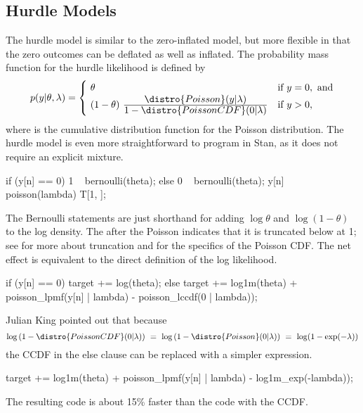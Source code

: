 \subsection{Hurdle Models}

The hurdle model is similar to the zero-inflated model, but more
flexible in that the zero outcomes can be deflated as well as
inflated.  The probability mass function for the hurdle likelihood is
defined by
%
\[
p(y|\theta,\lambda)
= 
\begin{cases}
\ \theta & \mbox{if } y = 0, \mbox{ and}
\\
\ (1 - \theta)
  \
   \frac{\displaystyle \distro{Poisson}(y | \lambda)}
        {\displaystyle \vspace*{8pt} 1 - \distro{PoissonCDF}(0 | \lambda)}
& \mbox{if } y > 0,
\end{cases}
\]
%
where  is the cumulative distribution function for
the Poisson distribution.  The hurdle model is even more straightforward to
program in Stan, as it does not require an explicit mixture.  
%
\begin{stancode}
   if (y[n] == 0)
      1 ~ bernoulli(theta);
    else {
      0 ~ bernoulli(theta);
      y[n] ~ poisson(lambda) T[1, ];
    }
\end{stancode}
%
The Bernoulli statements are just shorthand for adding $\log \theta$
and $\log (1 - \theta)$ to the log density.  The \code{T[1,]} after
the Poisson indicates that it is truncated below at 1; see
 for more about truncation and
 for the specifics of the Poisson CDF.  The net
effect is equivalent to the direct definition of the log likelihood.
%
\begin{stancode}
   if (y[n] == 0)
      target += log(theta);
    else
      target += log1m(theta) + poisson_lpmf(y[n] | lambda)
                - poisson_lccdf(0 | lambda));
\end{stancode}

Julian King pointed out that because
\[
\log \left( 1 - \distro{PoissonCDF}(0 | \lambda) \right)
\ = \ \log \left( 1 - \distro{Poisson}(0 | \lambda) \right) 
\ = \ \log(1 - \exp(-\lambda))
\]
the CCDF in the else clause can be replaced with a simpler expression.
%
\begin{stancode}
      target += log1m(theta) + poisson_lpmf(y[n] | lambda)
                - log1m_exp(-lambda));
\end{stancode}
%
The resulting code is about 15\% faster than the code with the CCDF.


